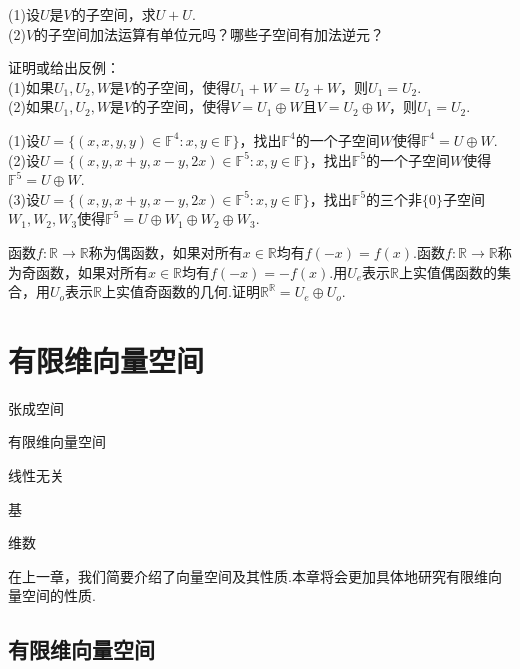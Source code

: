 \documentclass[lang=cn, zihao=5]{elegantbook}
\newcommand{\R}{\mathbb{R}}
\newcommand{\F}{\mathbb{F}}
\begin{document}
\begin{exercise} %
	(1)设$U$是$V$的子空间，求$U+U$. \\
	(2)$V$的子空间加法运算有单位元吗？哪些子空间有加法逆元？
\end{exercise}

\begin{exercise}
	证明或给出反例： \\
	(1)如果$U_1,U_2,W$是$V$的子空间，使得$U_1+W=U_2+W$，则$U_1=U_2$. \\
	(2)如果$U_1,U_2,W$是$V$的子空间，使得$V=U_1 \oplus W$且$V=U_2 \oplus W$，则$U_1=U_2$.
\end{exercise}

\begin{exercise}
	(1)设$U = \{ (x,x,y,y) \in \F ^{4} : x,y \in \F \}$，找出$\F ^{4}$的一个子空间$W$使得$\F ^{4} = U \oplus W$. \\
	(2)设$U = \{ (x,y,x+y,x-y,2x) \in \F ^{5} : x,y \in \F \}$，找出$\F ^{5}$的一个子空间$W$使得$\F ^{5} = U \oplus W$. \\
	(3)设$U = \{ (x,y,x+y,x-y,2x) \in \F ^{5} : x,y \in \F \}$，找出$\F ^{5}$的三个非$\{ 0 \}$子空间$W_1,W_2,W_3$使得$\F ^{5} = U \oplus W_1 \oplus W_2 \oplus W_3$.
\end{exercise}

\begin{exercise}
	函数$f: \R \to \R$称为偶函数，如果对所有$x \in \R$均有$f(-x) = f(x)$.函数$f: \R \to \R$称为奇函数，如果对所有$x \in \R$均有$f(-x) = -f(x)$.用$U_e$表示$\R$上实值偶函数的集合，用$U_o$表示$\R$上实值奇函数的几何.证明$\R ^{\R} = U_e \oplus U_o$.
\end{exercise}


\chapter{有限维向量空间}

\begin{introduction}
	\item 张成空间
	\item 有限维向量空间
	\item 线性无关
	\item 基
	\item 维数
\end{introduction}

在上一章，我们简要介绍了向量空间及其性质.本章将会更加具体地研究有限维向量空间的性质.

\section{有限维向量空间}
\end{document}
